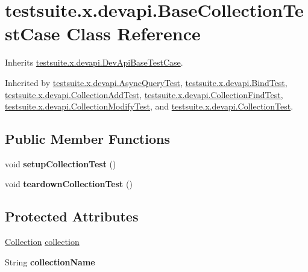 \hypertarget{classtestsuite_1_1x_1_1devapi_1_1_base_collection_test_case}{}\section{testsuite.\+x.\+devapi.\+Base\+Collection\+Test\+Case Class Reference}
\label{classtestsuite_1_1x_1_1devapi_1_1_base_collection_test_case}


Inherits \mbox{\hyperlink{classtestsuite_1_1x_1_1devapi_1_1_dev_api_base_test_case}{testsuite.\+x.\+devapi.\+Dev\+Api\+Base\+Test\+Case}}.



Inherited by \mbox{\hyperlink{classtestsuite_1_1x_1_1devapi_1_1_async_query_test}{testsuite.\+x.\+devapi.\+Async\+Query\+Test}}, \mbox{\hyperlink{classtestsuite_1_1x_1_1devapi_1_1_bind_test}{testsuite.\+x.\+devapi.\+Bind\+Test}}, \mbox{\hyperlink{classtestsuite_1_1x_1_1devapi_1_1_collection_add_test}{testsuite.\+x.\+devapi.\+Collection\+Add\+Test}}, \mbox{\hyperlink{classtestsuite_1_1x_1_1devapi_1_1_collection_find_test}{testsuite.\+x.\+devapi.\+Collection\+Find\+Test}}, \mbox{\hyperlink{classtestsuite_1_1x_1_1devapi_1_1_collection_modify_test}{testsuite.\+x.\+devapi.\+Collection\+Modify\+Test}}, and \mbox{\hyperlink{classtestsuite_1_1x_1_1devapi_1_1_collection_test}{testsuite.\+x.\+devapi.\+Collection\+Test}}.

\subsection*{Public Member Functions}
\begin{DoxyCompactItemize}
\item 
\mbox{\label{classtestsuite_1_1x_1_1devapi_1_1_base_collection_test_case_ad3e7bd1423767b561b28600823a5d3ca}} 
void {\bfseries setup\+Collection\+Test} ()
\item 
\mbox{\label{classtestsuite_1_1x_1_1devapi_1_1_base_collection_test_case_a03fa88da9faf0ab11376bb76c35c89fc}} 
void {\bfseries teardown\+Collection\+Test} ()
\end{DoxyCompactItemize}
\subsection*{Protected Attributes}
\begin{DoxyCompactItemize}
\item 
\mbox{\hyperlink{interfacecom_1_1mysql_1_1cj_1_1xdevapi_1_1_collection}{Collection}} \mbox{\hyperlink{classtestsuite_1_1x_1_1devapi_1_1_base_collection_test_case_afab9f41edef1f1ad90584af214cf1066}{collection}}
\item 
\mbox{\label{classtestsuite_1_1x_1_1devapi_1_1_base_collection_test_case_a93d027ae00f82a26b37d84d4270ff237}} 
String {\bfseries collection\+Name}
\end{DoxyCompactItemize}
